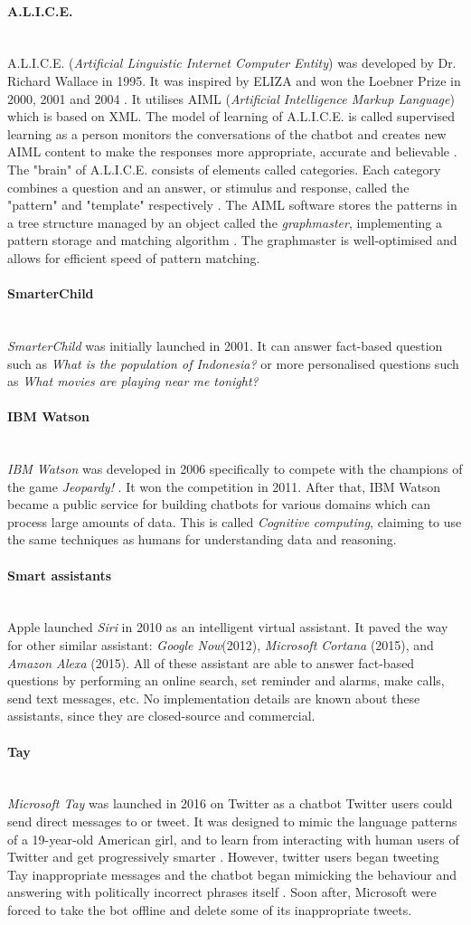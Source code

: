 \documentclass[12pt,a4paper]{article}
\newcommand{\myparagraph}[1]{\paragraph{#1}\mbox{}\\}
\begin{document}
\myparagraph{A.L.I.C.E.}
A.L.I.C.E. (\textit{Artificial Linguistic Internet Computer Entity}) was developed by Dr. Richard Wallace in 1995. It was inspired by ELIZA and won the Loebner Prize in 2000, 2001 and 2004 \cite[p.~182]{Wallace2009}. It utilises AIML (\textit{Artificial Intelligence Markup Language}) which is based on XML. The model of learning of A.L.I.C.E. is called supervised learning as a person monitors the conversations of the chatbot and creates new AIML content to make the responses more appropriate, accurate and believable \cite[p.~182]{Wallace2009}. The "brain" of A.L.I.C.E. consists of elements called categories. Each category combines a question and an answer, or stimulus and response, called the "pattern" and "template" respectively \cite[p.~182]{Wallace2009}.  The AIML software stores the patterns in a
tree structure managed by an object called the \textit{graphmaster}, implementing a pattern storage and matching algorithm \cite[p.~182]{Wallace2009}. The graphmaster is well-optimised and allows for efficient speed of pattern matching.

\myparagraph{SmarterChild}
\textit{SmarterChild} was initially launched in 2001. It can answer fact-based question such as \textit{What is the population of Indonesia?} or more personalised questions such as \textit{What movies are playing near me tonight?} \cite{SmarterChild:online}

\myparagraph{IBM Watson}
\textit{IBM Watson} was developed in 2006 specifically to compete with the champions of the game \textit{Jeopardy!} \cite{futurism:online}. It won the competition in 2011. After that, IBM Watson became a public service for building chatbots for various domains which can process large amounts of data. This is called \textit{Cognitive computing}, claiming to use the same techniques as humans for understanding data and reasoning.

\myparagraph{Smart assistants}
Apple launched \textit{Siri} in 2010 as an intelligent virtual assistant. It paved the way for other similar assistant: \textit{Google Now}(2012), \textit{Microsoft Cortana} (2015), and \textit{Amazon Alexa} (2015). All of these assistant are able to answer fact-based questions by performing an online search, set reminder and alarms, make calls, send text messages, etc.
No implementation details are known about these assistants, since they are closed-source and commercial.

\myparagraph{Tay}
\textit{Microsoft Tay} was launched in 2016 \cite{Taytweet55:online} on Twitter as a chatbot Twitter users could send direct messages to or tweet. It was designed to mimic the language patterns of a 19-year-old American girl, and to learn from interacting with human users of Twitter and get progressively smarter \cite{Microsof8:online}. However, twitter users began tweeting Tay inappropriate messages and the chatbot began mimicking the behaviour and answering with politically incorrect phrases itself \cite{Microsof8:online}. Soon after, Microsoft were forced to take the bot offline and delete some of its inappropriate tweets.
\end{document}

